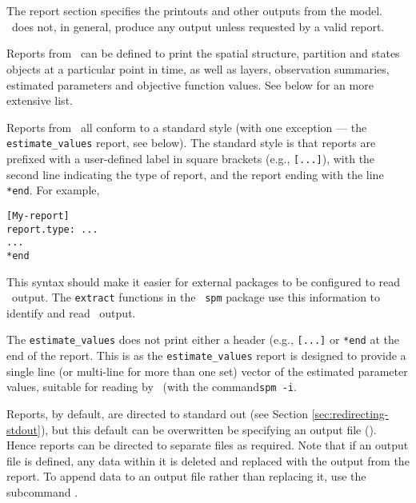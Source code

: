 \section{\label{sec:report-section}}

The report section specifies the printouts and other outputs from the model. \SPM\ does not, in general, produce any output unless requested by a valid report. 

Reports from \SPM\ can be defined to print the spatial structure, partition and states objects at a particular point in time, as well as layers, observation summaries, estimated parameters and objective function values. See below for an more extensive list.

Reports from \SPM\ all conform to a standard style (with one exception --- the \texttt{estimate\_values} report, see below). The standard style is that reports are prefixed with a user-defined label in square brackets (e.g., \texttt{[...]}), with the second line indicating the type of report, and the report ending with the line \texttt{*end}. For example,

\begin{verbatim} 
[My-report]
report.type: ...
...
*end
\end{verbatim}

This syntax should make it easier for external packages to be configured to read \SPM\ output. The \texttt{extract} functions in the \R\ \texttt{spm} package use this information to identify and read \SPM\ output.

The \texttt{estimate\_values} does not print either a header (e.g., \texttt{[...]} or \texttt{*end} at the end of the report. This is as the \texttt{estimate\_values} report is designed to provide a single line (or multi-line for more than one set) vector of the estimated parameter values, suitable for reading by \SPM\ (with the command\texttt{spm -i}. 

Reports, by default, are directed to standard out (see Section \ref{sec:redirecting-stdout}), but this default can be overwritten be specifying an output file (). Hence reports can be directed to separate files as required. Note that if an output file is defined, any data within it is deleted and replaced with the output from the report. To append data to an output file rather than replacing it, use the subcommand .

